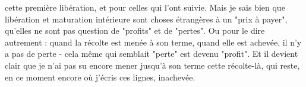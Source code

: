 cette première libération, et pour celles qui l'ont suivie. Mais je sais bien que libération et maturation intérieure sont choses étrangères à un "prix à payer", qu'elles ne sont pas question de "profits" et de "pertes". Ou pour le dire autrement : quand la récolte est menée à son terme, quand elle est achevée, il n’y a pas de perte - cela même qui semblait "perte" est devenu "profit". Et il devient clair que je n'ai pas su encore mener jusqu'à son terme cette récolte-là, qui reste, en ce moment encore où j'écris ces lignes, inachevée.



